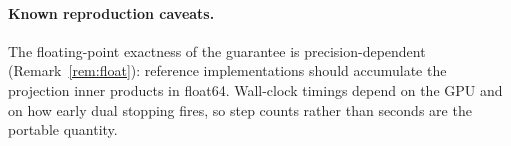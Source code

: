 \documentclass{article}
\theoremstyle{remark}
\theoremstyle{plain}
\begin{document}
\paragraph{Known reproduction caveats.}
The floating-point exactness of the guarantee is precision-dependent
(Remark~\ref{rem:float}): reference implementations should accumulate the
projection inner products in float64. Wall-clock timings depend on the GPU and
on how early dual stopping fires, so step counts rather than seconds are the
portable quantity.
\end{document}
